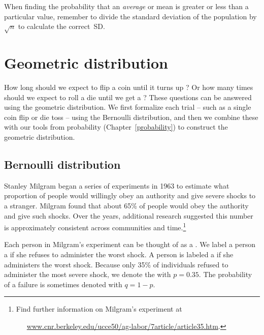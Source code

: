 \begin{tipBox}{
When finding the probability that an \emph{average} or mean is greater or less than a particular value, remember to divide the standard deviation of the population by $\sqrt{n}$ to calculate the correct~SD.}
\end{tipBox}


\section{Geometric distribution}
\label{geomDist}

How long should we expect to flip a coin until it turns up ? Or how many times should we expect to roll a die until we get a ? These questions can be answered using the geometric distribution. We first formalize each trial -- such as a single coin flip or die toss -- using the Bernoulli distribution, and then we combine these with our tools from probability (Chapter~\ref{probability}) to construct the geometric distribution.

\subsection{Bernoulli distribution}
\label{bernoulli}


Stanley Milgram began a series of experiments in 1963 to estimate what proportion of people would willingly obey an authority and give severe shocks to a stranger. Milgram found that about 65\% of people would obey the authority and give such shocks. Over the years, additional research suggested this number is approximately consistent across communities and time.\footnote{Find further information on Milgram's experiment at \par \ \ \hspace{0.2mm}\ \href{http://www.cnr.berkeley.edu/ucce50/ag-labor/7article/article35.htm}{www.cnr.berkeley.edu/ucce50/ag-labor/7article/article35.htm}.}

Each person in Milgram's experiment can be thought of as a . We label a person a  if she refuses to administer the worst shock. A person is labeled a  if she administers the worst shock. Because only 35\% of individuals refused to administer the most severe shock, we denote the  with $p=0.35$. The probability of a failure is sometimes denoted with $q=1-p$.


